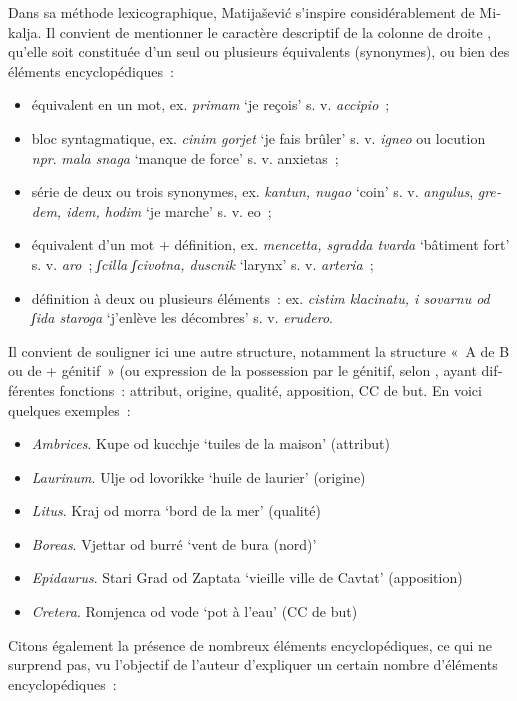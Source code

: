 \documentclass[output=paper,colorlinks,citecolor=brown,arabicfont,chinesefont,booklanguage=french]{langscibook}
\begin{document}
\begin{otherlanguage}{french}
Dans sa méthode lexicographique, Matijašević s’inspire considérablement de Mikalja. Il convient de mentionner le caractère descriptif de la colonne de droite \citep{BilicFranic2007}, qu’elle soit constituée d’un seul ou plusieurs équivalents (synonymes), ou bien des éléments encyclopédiques~:
\begin{itemize}
    \item équivalent en un mot, ex. \emph{primam} ‘je reçois’ s. v. \emph{accipio}~;
    \item bloc syntagmatique, ex. \emph{cinim gorjet} ‘je fais brûler’ s. v. \emph{igneo} ou locution \emph{npr}. \emph{mala snaga} ‘manque de force’ s. v. anxietas~;
    \item série de deux ou trois synonymes, ex. \emph{kantun, nugao} ‘coin’ s. v. \emph{angulus}, \emph{gredem, idem, hodim} ‘je marche’ s. v. eo~;
    \item équivalent d’un mot + définition, ex. \emph{mencetta, sgradda tvarda} ‘bâtiment fort’ s. v. \emph{aro~}; \emph{ʃcilla ʃcivotna, duscnik} ‘larynx’ s. v. \emph{arteria~};
    \item définition à deux ou plusieurs éléments~: ex. \emph{cistim klacinatu, i sovarnu od ʃida staroga} ‘j’enlève les décombres’ s. v. \emph{erudero}.
\end{itemize} 

Il convient de souligner ici une autre structure, notamment la structure «~A de B ou de + génitif~» (ou expression de la possession par le génitif, selon \citet{Gabric_bagaric2002}, ayant différentes fonctions~: attribut, origine, qualité, apposition, CC de but. En voici quelques exemples~:
\begin{itemize}
    \item \emph{Ambrices}. Kupe od kucchje ‘tuiles de la maison’ (attribut)
    \item \emph{Laurinum}. Ulje od lovorikke ‘huile de laurier’ (origine)
    \item \emph{Litus}. Kraj od morra ‘bord de la mer’ (qualité)
    \item\emph{Boreas}. Vjettar od burré ‘vent de bura (nord)’
    \item\emph{Epidaurus}. Stari Grad od Zaptata ‘vieille ville de Cavtat’ (apposition)
    \item\emph{Cretera}. Romjenca od vode ‘pot à l’eau’ (CC de but)
\end{itemize}

Citons également la présence de nombreux éléments encyclopédiques, ce qui ne surprend pas, vu l’objectif de l’auteur d’expliquer un certain nombre d’éléments encyclopédiques~:


\end{otherlanguage}
\end{document}
